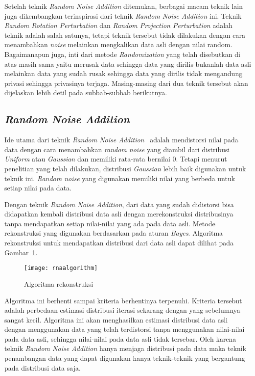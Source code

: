 Setelah teknik \textit{Random Noise Addition} ditemukan, berbagai macam teknik lain juga dikembangkan terinspirasi dari teknik \textit{Random Noise Addition} ini. Teknik \textit{Random Rotation Perturbation} dan \textit{Random Projection Perturbation} adalah teknik adalah salah satunya, tetapi teknik tersebut tidak dilakukan dengan cara menambahkan \textit{noise} melainkan mengkalikan data asli dengan nilai random. Bagaimanapun juga, inti dari metode \textit{Randomization} yang telah disebutkan di atas masih sama yaitu merusak data sehingga data yang dirilis bukanlah data asli melainkan data yang sudah rusak sehingga data yang dirilis tidak mengandung privasi sehingga privasinya terjaga. Masing-masing dari dua teknik tersebut akan dijelaskan lebih detil pada subbab-subbab berikutnya.

\subsection{\textit{Random Noise Addition}}
\label{subsec:rna}

Ide utama dari teknik \textit{Random Noise Addition}~\cite{agrawalsrikant:00:randomnoise} adalah mendistorsi nilai pada data dengan cara menambahkan \textit{random noise} yang diambil dari distribusi \textit{Uniform} atau \textit{Gaussian} dan memiliki rata-rata bernilai 0. Tetapi menurut penelitian yang telah dilakukan, distribusi \textit{Gaussian} lebih baik digunakan untuk teknik ini. \textit{Random noise} yang digunakan memiliki nilai yang berbeda untuk setiap nilai pada data.

Dengan teknik \textit{Random Noise Addition}, dari data yang sudah didistorsi bisa didapatkan kembali distribusi data asli dengan merekonstruksi distribusinya tanpa mendapatkan setiap nilai-nilai yang ada pada data asli. Metode rekonstruksi yang digunakan berdasarkan pada aturan \textit{Bayes}. Algoritma rekonstruksi untuk mendapatkan distribusi dari data asli dapat dilihat pada Gambar~\ref{fig:rnaalgorithm}.

\begin{figure}
	\centering
	\texttt{[image: rnaalgorithm]}
	\caption{Algoritma rekonstruksi}
	\label{fig:rnaalgorithm}
\end{figure}

Algoritma ini berhenti sampai kriteria berhentinya terpenuhi. Kriteria tersebut adalah perbedaan estimasi distribusi iterasi sekarang dengan yang sebelumnya sangat kecil. Algoritma ini akan menghasilkan estimasi distribusi data asli dengan menggunakan data yang telah terdistorsi tanpa menggunakan nilai-nilai pada data asli, sehingga nilai-nilai pada data asli tidak tersebar. Oleh karena teknik \textit{Random Noise Addition} hanya menjaga distribusi pada data maka teknik penambangan data yang dapat digunakan hanya teknik-teknik yang bergantung pada distribusi data saja.

